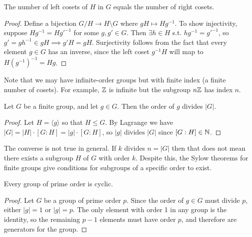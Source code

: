 \begin{theorem}
  The number of left cosets of $H$ in $G$ equals the number of right cosets. 
\end{theorem}
\begin{proof}
  Define a bijection $G/H\to H\setminus G$ where $gH\mapsto Hg^{-1}$. To show injectivity,
  suppose $Hg^{-1}=Hg'^{-1}$ for some $g,g'\in G$. Then $\exists h\in H$ s.t.
  $hg^{-1} = g'^{-1}$, so $g' = gh^{-1}\in gH \implies g'H=gH$. Surjectivity follows from
  the fact that every element $g \in G$ has an inverse, since the left coset $g^{-1}H$ will map to $H\left(g^{-1}\right)^{-1} = Hg$.
\end{proof}

Note that we may have infinite-order groups but with finite index (a finite number of
cosets). For example, $\mathbb Z$ is infinite but the subgroup $n\mathbb Z$ has index $n.$

\begin{corollary}
  Let $G$ be a finite group, and let $g\in G$. Then the order of $g$ divides $|G|$.
  \label{lagrangeConsequence}
\end{corollary}
\begin{proof}
  Let $H=\langle g \rangle$ so that $H\leq G$. By Lagrange we have $|G|=|H|\cdot[G:H]=|g| \cdot [G:H]$, so $\lvert g\rvert \text{ divides } |G|$ since $[G:H] \in \mathbb N$.
\end{proof}

\begin{remark}
    The converse is not true in general. If $k$ divides $n = |G|$ then that does not mean there exists a subgroup $H$ of $G$ with order $k$. Despite this, the Sylow theorems for finite groups give conditions for subgroups of a specific order to exist.
\end{remark}

\begin{corollary}
    Every group of prime order is cyclic.
\end{corollary}

\begin{proof}
    Let $G$ be a group of prime order $p$. Since the order of $g\in G$ must divide $p$, either $|g|=1$ or $|g|=p$. The only element with order 1 in any group is the identity, so the remaining $p-1$ elements must have order $p$, and therefore are generators for the group.
\end{proof}

